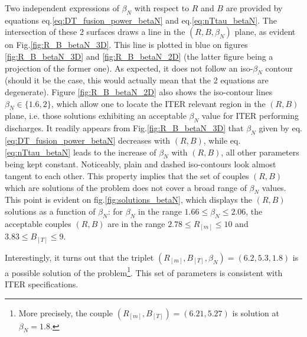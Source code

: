 Two independent expressions of $\beta_N$ with respect to $R$ and $B$ are provided by equations eq.\ref{eq:DT_fusion_power_betaN} and eq.\ref{eq:nTtau_betaN}. The intersection of these 2 surfaces draws a line in the $(R,B,\beta_N)$ plane, as evident on Fig.\ref{fig:R_B_betaN_3D}. This line is plotted in blue on figures \ref{fig:R_B_betaN_3D} and \ref{fig:R_B_betaN_2D} (the latter figure being a projection of the former one). As expected, it does not follow an iso-$\beta_N$ contour (should it be the case, this would actually mean that the 2 equations are degenerate). Figure \ref{fig:R_B_betaN_2D} also shows the iso-contour lines $\beta_N \in \{1.6, 2\}$, which allow one to locate the ITER relevant region in the $(R,B)$ plane, i.e. those solutions exhibiting an acceptable $\beta_N$ value for ITER performing discharges. 
It readily appears from Fig.\ref{fig:R_B_betaN_3D} that $\beta_N$ given by eq.\ref{eq:DT_fusion_power_betaN} decreases with $(R,B)$, while eq.\ref{eq:nTtau_betaN} leads to the increase of $\beta_N$ with $(R,B)$, all other parameters being kept constant.
Noticeably, plain and dashed iso-contours look almost tangent to each other. This property implies that the set of couples $(R,B)$ which are solutions of the problem does not cover a broad range of $\beta_N$ values. This point is evident on fig.\ref{fig:solutions_betaN}, which displays the $(R,B)$ solutions as a function of $\beta_N$: for $\beta_N$ in the range $1.66 \leq \beta_N \leq 2.06$, the acceptable couples $(R,B)$ are in the range $2.78 \leq R_{[m]} \leq 10$ and $3.83 \leq B_{[T]} \leq 9$.

Interestingly, it turns out that the triplet $(R_{[m]},B_{[T]},\beta_N) = (6.2, 5.3, 1.8)$ is a possible solution of the problem\footnote{More precisely, the couple $(R_{[m]},B_{[T]}) = (6.21, 5.27)$ is solution at $\beta_N=1.8$.}. This set of parameters is consistent with ITER specifications.
